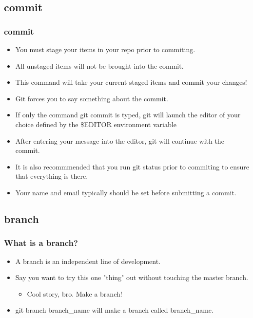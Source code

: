 \documentclass{beamer}
\begin{document}
\subsection{commit}
\begin{frame}
    \frametitle{commit}
    \begin{itemize}
        \item{You must stage your items in your repo prior to commiting.}
        \item{All unstaged items will not be brought into the commit.}
        \item{This command will take your current staged items and commit your changes!}
        \item{Git forces you to say something about the commit.}
        \item{If only the command git commit is typed, git will launch the editor of your choice defined by the \$EDITOR environment variable}
        \item{After entering your message into the editor, git will continue with the commit.}
        \item{It is also recommmended that you run git status prior to commiting to ensure that everything is there.}
        \item{Your name and email typically should be set before submitting a commit.}
    \end{itemize}
\end{frame}

\subsection{branch}
\begin{frame}
    \frametitle{What is a branch?}
    \begin{itemize}
        \item{A branch is an independent line of development.}
        \item{Say you want to try this one "thing" out without touching the master branch.}
            \begin{itemize}
                \item{Cool story, bro. Make a branch!}
            \end{itemize}
        \item{git branch branch\_name will make a branch called branch\_name.}
    \end{itemize}
\end{frame}
\end{document}
